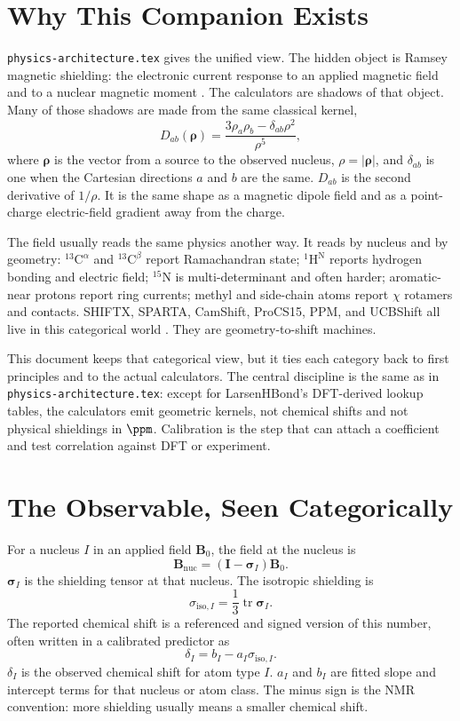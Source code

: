 \documentclass[11pt]{article}
\newcommand{\code}[1]{\texttt{#1}}
\begin{document}
\tableofcontents
\clearpage

\section{Why This Companion Exists}

\code{physics-architecture.tex} gives the unified view. The hidden object is
Ramsey magnetic shielding: the electronic current response to an applied
magnetic field and to a nuclear magnetic moment \cite{ramsey1950,facelli2011}.
The calculators are shadows of that object. Many of those shadows are made from
the same classical kernel,
\[
  D_{ab}(\bm\rho)
  =
  \frac{3\rho_a\rho_b-\delta_{ab}\rho^2}{\rho^5},
\]
where \(\bm\rho\) is the vector from a source to the observed nucleus,
\(\rho=|\bm\rho|\), and \(\delta_{ab}\) is one when the Cartesian directions
\(a\) and \(b\) are the same. \(D_{ab}\) is the second derivative of
\(1/\rho\). It is the same shape as a magnetic dipole field and as a
point-charge electric-field gradient away from the charge.

The field usually reads the same physics another way. It reads by nucleus and
by geometry: \(^{13}\mathrm C^\alpha\) and \(^{13}\mathrm C^\beta\) report
Ramachandran state; \(^{1}\mathrm H^\mathrm N\) reports hydrogen bonding and
electric field; \(^{15}\mathrm N\) is multi-determinant and often harder;
aromatic-near protons report ring currents; methyl and side-chain atoms report
\(\chi\) rotamers and contacts. SHIFTX, SPARTA, CamShift, ProCS15, PPM, and
UCBShift all live in this categorical world
\cite{neal2003,shenbax2007,shenbax2010,kohlhoff2009,han2011,larsen2015,li2012,ptaszek2024}.
They are geometry-to-shift machines.

This document keeps that categorical view, but it ties each category back to
first principles and to the actual calculators. The central discipline is the
same as in \code{physics-architecture.tex}: except for LarsenHBond's DFT-derived
lookup tables, the calculators emit geometric kernels, not chemical shifts and
not physical shieldings in \(\si{\ppm}\). Calibration is the step that can
attach a coefficient and test correlation against DFT or experiment.

\section{The Observable, Seen Categorically}

For a nucleus \(I\) in an applied field \(\bm B_0\), the field at the nucleus is
\[
  \bm B_{\mathrm{nuc}}=(\bm I-\bm\sigma_I)\bm B_0 .
\]
\(\bm\sigma_I\) is the shielding tensor at that nucleus. The isotropic
shielding is
\[
  \sigma_{\mathrm{iso},I}
  =
  \frac{1}{3}\operatorname{tr}\bm\sigma_I .
\]
The reported chemical shift is a referenced and signed version of this number,
often written in a calibrated predictor as
\[
  \delta_I=b_I-a_I\sigma_{\mathrm{iso},I}.
\]
\(\delta_I\) is the observed chemical shift for atom type \(I\).
\(a_I\) and \(b_I\) are fitted slope and intercept terms for that nucleus or
atom class. The minus sign is the NMR convention: more shielding usually means
a smaller chemical shift.
\end{document}
